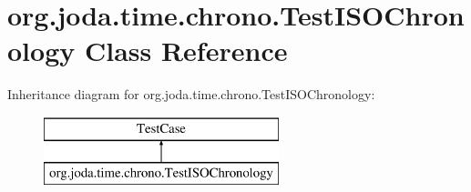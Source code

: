\hypertarget{classorg_1_1joda_1_1time_1_1chrono_1_1_test_i_s_o_chronology}{\section{org.\-joda.\-time.\-chrono.\-Test\-I\-S\-O\-Chronology Class Reference}
\label{classorg_1_1joda_1_1time_1_1chrono_1_1_test_i_s_o_chronology}
}
Inheritance diagram for org.\-joda.\-time.\-chrono.\-Test\-I\-S\-O\-Chronology\-:\begin{figure}[H]
\begin{center}
\leavevmode
\includegraphics[height=2.000000cm]{classorg_1_1joda_1_1time_1_1chrono_1_1_test_i_s_o_chronology}
\end{center}
\end{figure}
